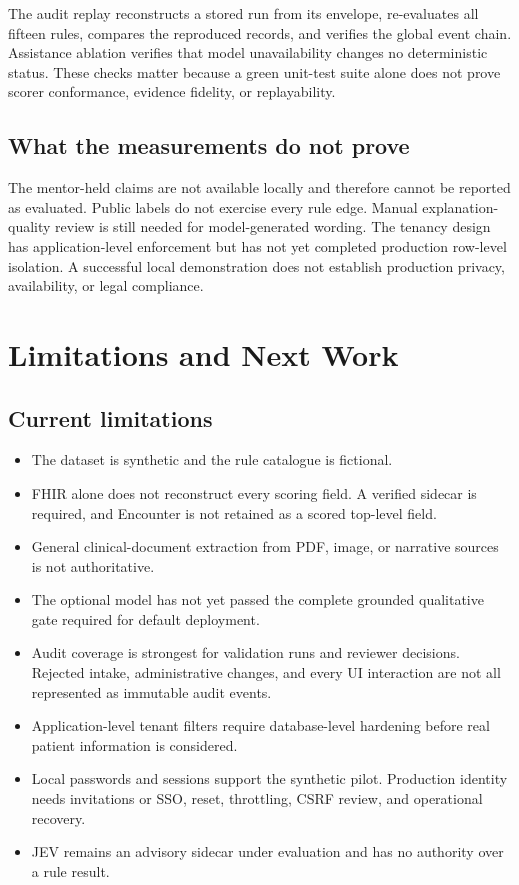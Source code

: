 \documentclass[11pt,a4paper,oneside]{report}
\begin{document}
The audit replay reconstructs a stored run from its envelope, re-evaluates all fifteen rules, compares the reproduced records, and verifies the global event chain. Assistance ablation verifies that model unavailability changes no deterministic status. These checks matter because a green unit-test suite alone does not prove scorer conformance, evidence fidelity, or replayability.

\section{What the measurements do not prove}
The mentor-held claims are not available locally and therefore cannot be reported as evaluated. Public labels do not exercise every rule edge. Manual explanation-quality review is still needed for model-generated wording. The tenancy design has application-level enforcement but has not yet completed production row-level isolation. A successful local demonstration does not establish production privacy, availability, or legal compliance.

\chapter{Limitations and Next Work}

\begingroup
\small
\section{Current limitations}

\begin{itemize}
  \item The dataset is synthetic and the rule catalogue is fictional.
  \item FHIR alone does not reconstruct every scoring field. A verified sidecar is required, and Encounter is not retained as a scored top-level field.
  \item General clinical-document extraction from PDF, image, or narrative sources is not authoritative.
  \item The optional model has not yet passed the complete grounded qualitative gate required for default deployment.
  \item Audit coverage is strongest for validation runs and reviewer decisions. Rejected intake, administrative changes, and every UI interaction are not all represented as immutable audit events.
  \item Application-level tenant filters require database-level hardening before real patient information is considered.
  \item Local passwords and sessions support the synthetic pilot. Production identity needs invitations or SSO, reset, throttling, CSRF review, and operational recovery.
  \item JEV remains an advisory sidecar under evaluation and has no authority over a rule result.
\end{itemize}
\end{document}
